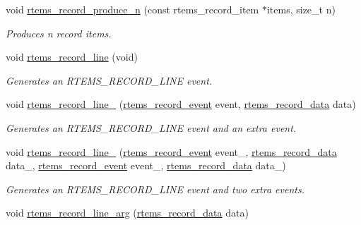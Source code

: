 \begin{DoxyCompactItemize}
void \mbox{\hyperlink{group__RTEMSRecord_ga6a5e78dd15cbd85267cdc97e4ee4e0bc}{rtems\+\_\+record\+\_\+produce\+\_\+n}} (const rtems\+\_\+record\+\_\+item $\ast$items, size\+\_\+t n)
\begin{DoxyCompactList}\small\item\em Produces n record items. \end{DoxyCompactList}\item 
void \mbox{\hyperlink{group__RTEMSRecord_gafeade04066a667db801ae71a60119c03}{rtems\+\_\+record\+\_\+line}} (void)
\begin{DoxyCompactList}\small\item\em Generates an R\+T\+E\+M\+S\+\_\+\+R\+E\+C\+O\+R\+D\+\_\+\+L\+I\+NE event. \end{DoxyCompactList}\item 
void \mbox{\hyperlink{group__RTEMSRecord_ga6f9cb236fa4ba2fa458eea2ec433952b}{rtems\+\_\+record\+\_\+line\+\_}} (\mbox{\hyperlink{group__RTEMSRecord_gac748f47c13acd7d0595694ed7f19074b}{rtems\+\_\+record\+\_\+event}} event, \mbox{\hyperlink{group__RTEMSRecord_gab483bd3ec735835dac6788b78c817eab}{rtems\+\_\+record\+\_\+data}} data)
\begin{DoxyCompactList}\small\item\em Generates an R\+T\+E\+M\+S\+\_\+\+R\+E\+C\+O\+R\+D\+\_\+\+L\+I\+NE event and an extra event. \end{DoxyCompactList}\item 
void \mbox{\hyperlink{group__RTEMSRecord_gaf7ef62ae9e2ff1e27c7b1d2a0bcfcc6e}{rtems\+\_\+record\+\_\+line\+\_}} (\mbox{\hyperlink{group__RTEMSRecord_gac748f47c13acd7d0595694ed7f19074b}{rtems\+\_\+record\+\_\+event}} event\+\_, \mbox{\hyperlink{group__RTEMSRecord_gab483bd3ec735835dac6788b78c817eab}{rtems\+\_\+record\+\_\+data}} data\+\_, \mbox{\hyperlink{group__RTEMSRecord_gac748f47c13acd7d0595694ed7f19074b}{rtems\+\_\+record\+\_\+event}} event\+\_, \mbox{\hyperlink{group__RTEMSRecord_gab483bd3ec735835dac6788b78c817eab}{rtems\+\_\+record\+\_\+data}} data\+\_)
\begin{DoxyCompactList}\small\item\em Generates an R\+T\+E\+M\+S\+\_\+\+R\+E\+C\+O\+R\+D\+\_\+\+L\+I\+NE event and two extra events. \end{DoxyCompactList}\item 
void \mbox{\hyperlink{group__RTEMSRecord_ga112e2b151dc4e4241f36a52c0413b40b}{rtems\+\_\+record\+\_\+line\+\_\+arg}} (\mbox{\hyperlink{group__RTEMSRecord_gab483bd3ec735835dac6788b78c817eab}{rtems\+\_\+record\+\_\+data}} data)

\end{DoxyCompactItemize}
